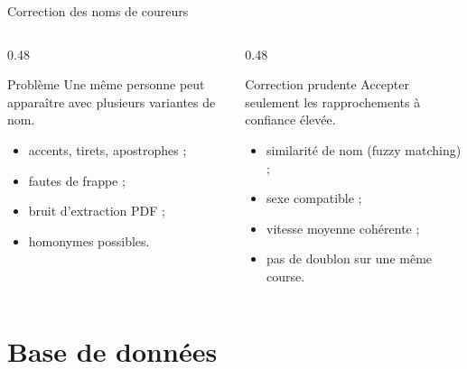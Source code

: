 \documentclass[aspectratio=169,11pt]{beamer}
\begin{document}
\begin{frame}{Correction des noms de coureurs}
  \begin{columns}[T,onlytextwidth]
    \begin{column}{0.48\textwidth}
      \begin{block}{Problème}
        Une même personne peut apparaître avec plusieurs variantes de nom.
      \end{block}
      \begin{itemize}
        \item accents, tirets, apostrophes ;
        \item fautes de frappe ;
        \item bruit d'extraction PDF ;
        \item homonymes possibles.
      \end{itemize}
    \end{column}
    \begin{column}{0.48\textwidth}
      \begin{block}{Correction prudente}
         Accepter seulement les rapprochements à confiance élevée.
      \end{block}
      \begin{itemize}
        \item similarité de nom (fuzzy matching) ;
        \item sexe compatible ;
        \item vitesse moyenne cohérente ;
        \item pas de doublon sur une même course.
      \end{itemize}
    \end{column}
  \end{columns}
\end{frame}

\section{Base de données}
\end{document}
